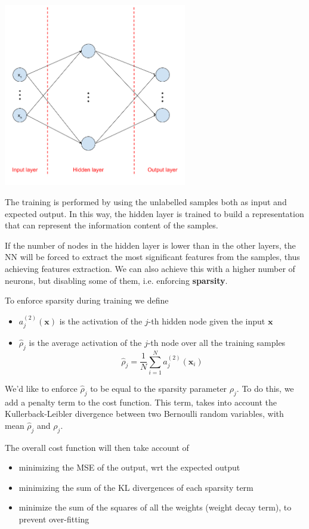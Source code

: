 \documentclass[oneside,onecolumn]{report}
\begin{document}
\begin{center}
    \includegraphics[width=8cm]{autoencoder.png}
\end{center}

The training is performed by using the unlabelled samples both as input and expected output.
In this way, the hidden layer is trained to build a representation that can represent the information content of the samples.

If the number of nodes in the hidden layer is lower than in the other layers, the NN will be forced to extract the most significant features from the samples, thus achieving features extraction.
We can also achieve this with a higher number of neurons, but disabling some of them, i.e. enforcing \textbf{sparsity}.

To enforce sparsity during training we define
\begin{itemize}
    \item $a_j^{(2)}(\bm x)$ is the activation of the $j$-th hidden node given the input $\bm x$
    \item $\widehat \rho_j$ is the average activation of the $j$-th node over all the training samples
    $$ \widehat \rho_j = \frac{1}{N} \sum_{i = 1}^N a_j^{(2)}(\bm x_i) $$
\end{itemize}

We'd like to enforce $\widehat \rho_j$ to be equal to the sparsity parameter $\rho_j$.
To do this, we add a penalty term to the cost function.
This term, takes into account the Kullerback-Leibler divergence between two Bernoulli random variables, with mean $\widehat \rho_j$ and $\rho_j$.

The overall cost function will then take account of
\begin{itemize}
    \item minimizing the MSE of the output, wrt the expected output
    \item minimizing the sum of the KL divergences of each sparsity term
    \item minimize the sum of the squares of all the weights (weight decay term), to prevent over-fitting
\end{itemize}
\end{document}
